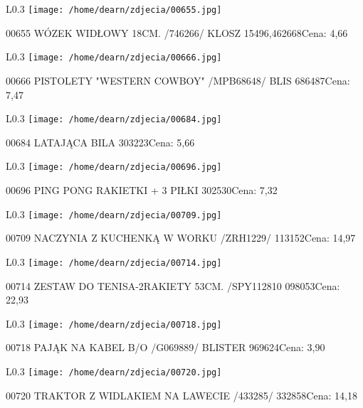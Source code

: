 \begin{wrapfigure}{L}{0.3\textwidth}
\texttt{[image: /home/dearn/zdjecia/00655.jpg]}
\end{wrapfigure}
00655 WÓZEK WIDŁOWY 18CM. /746266/  KLOSZ       15496,462668Cena: 4,66\newline
\begin{wrapfigure}{L}{0.3\textwidth}
\texttt{[image: /home/dearn/zdjecia/00666.jpg]}
\end{wrapfigure}
00666 PISTOLETY "WESTERN COWBOY" /MPB68648/ BLIS      686487Cena: 7,47\newline
\begin{wrapfigure}{L}{0.3\textwidth}
\texttt{[image: /home/dearn/zdjecia/00684.jpg]}
\end{wrapfigure}
00684 LATAJĄCA BILA 303223Cena: 5,66\newline
\begin{wrapfigure}{L}{0.3\textwidth}
\texttt{[image: /home/dearn/zdjecia/00696.jpg]}
\end{wrapfigure}
00696 PING PONG RAKIETKI + 3 PIŁKI 302530Cena: 7,32\newline
\begin{wrapfigure}{L}{0.3\textwidth}
\texttt{[image: /home/dearn/zdjecia/00709.jpg]}
\end{wrapfigure}
00709 NACZYNIA Z KUCHENKĄ W WORKU /ZRH1229/           113152Cena: 14,97\newline
\begin{wrapfigure}{L}{0.3\textwidth}
\texttt{[image: /home/dearn/zdjecia/00714.jpg]}
\end{wrapfigure}
00714 ZESTAW DO TENISA-2RAKIETY 53CM. /SPY112810      098053Cena: 22,93\newline
\begin{wrapfigure}{L}{0.3\textwidth}
\texttt{[image: /home/dearn/zdjecia/00718.jpg]}
\end{wrapfigure}
00718 PAJĄK NA KABEL B/O /G069889/ BLISTER            969624Cena: 3,90\newline
\begin{wrapfigure}{L}{0.3\textwidth}
\texttt{[image: /home/dearn/zdjecia/00720.jpg]}
\end{wrapfigure}
00720 TRAKTOR Z WIDLAKIEM NA LAWECIE /433285/         332858Cena: 14,18\newline
